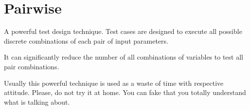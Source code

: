 \section{Pairwise}
\label{sec:Pairwise}

A powerful test design technique. Test cases are designed to execute all possible discrete combinations of each pair of input parameters. 

It can significantly reduce the number of all combinations of variables to test all pair combinations.

Usually this powerful technique is used as a waste of time with respective attitude. Please, do not try it at home. You can fake that you totally understand what is talking about.